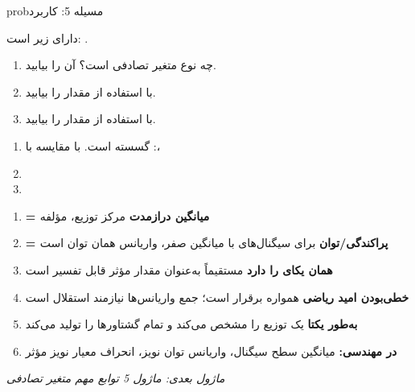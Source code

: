 \begin{PSbox}[unbreakable]{prob}{مسیله 5: کاربرد }

 دارای  زیر است: .

\begin{enumerate}
\def\labelenumi{(\PSalph{enumi})}
\tightlist
\item
   چه نوع متغیر تصادفی است؟  آن را بیابید.
\item
  با استفاده از  مقدار  را بیابید.
\item
  با استفاده از  مقدار  را بیابید.
\end{enumerate}

\PSsolution{} 

\begin{enumerate}
\def\labelenumi{(\PSalph{enumi})}
\item
   گسسته است. با مقایسه با :\PSbr{}، 
\item
  \PSbr{}
\item
  \PSbr{}\PSbr{}
\end{enumerate}

\end{PSbox}


\begin{enumerate}
\def\labelenumi{\arabic{enumi}.}
\tightlist
\item
  \textbf{ = میانگین درازمدت}  مرکز توزیع، مؤلفه 
\item
  \textbf{ = پراکندگی/توان}  برای سیگنال‌های با میانگین صفر، واریانس همان توان است
\item
  \textbf{\lr{$\sigma$} همان یکای  را دارد}  مستقیماً به‌عنوان مقدار مؤثر  قابل تفسیر است
\item
  \textbf{خطی‌بودن امید ریاضی} همواره برقرار است؛ جمع واریانس‌ها نیازمند استقلال است
\item
  \textbf{ به‌طور یکتا} یک توزیع را مشخص می‌کند و تمام گشتاورها را تولید می‌کند
\item
  \textbf{در مهندسی:} میانگین \lr{\mbox{\ensuremath{\to}}} سطح سیگنال، واریانس \lr{\mbox{\ensuremath{\to}}} توان نویز، انحراف معیار \lr{\mbox{\ensuremath{\to}}} نویز مؤثر
\end{enumerate}

\emph{ماژول بعدی: {ماژول 5  توابع مهم متغیر تصادفی}}
